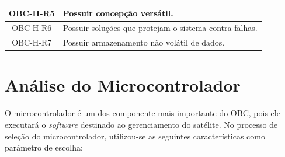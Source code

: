 \begin{table}[h]
{\begin{tabular}{@{}cl@{}}
			OBC-H-R5            & Possuir concepção versátil.                                                                                                                                                                                                                   \\ \hline
			OBC-H-R6            & Possuir soluções que protejam o sistema contra falhas.                                                                                                                                                                                        \\ \hline
			OBC-H-R7            & Possuir armazenamento não volátil de dados.                                                                                                                                                                                                   \\ \bottomrule
	\end{tabular}}
\end{table}

\section{Análise do Microcontrolador}

O microcontrolador é um dos componente mais importante do OBC, pois ele executará o \textit{software} destinado ao gerenciamento do satélite. No processo de seleção do microcontrolador, utilizou-se as seguintes características como parâmetro de escolha:

